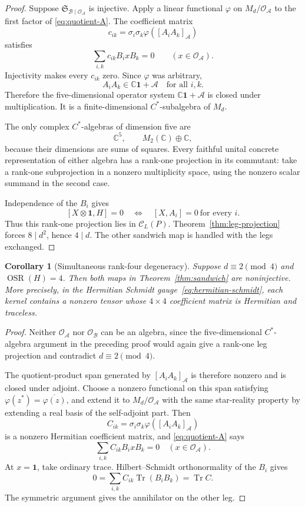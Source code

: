 \documentclass[11pt]{article}
\newtheorem{corollary}[theorem]{Corollary}
\theoremstyle{definition}
\theoremstyle{remark}
\newcommand{\Id}{\mathbf 1}
\newcommand{\Tr}{\operatorname{Tr}}
\newcommand{\OSR}{\operatorname{OSR}}
\newcommand{\bbC}{\mathbb C}
\newcommand{\cA}{\mathcal A}
\newcommand{\cB}{\mathcal B}
\newcommand{\cC}{\mathcal C}
\newcommand{\cO}{\mathcal O}
\newcommand{\cS}{\mathfrak S}
\begin{document}
\begin{proof}
Suppose \(\cS_{\cB\mid\cO_{\cA}}\) is injective. Apply a linear
functional \(\varphi\) on \(M_d/\cO_{\cA}\) to the first factor of
\eqref{eq:quotient-A}. The coefficient matrix
\[
  c_{ik}=\sigma_i\sigma_k
  \varphi([A_iA_k]_{\cA})
\]
satisfies
\[
  \sum_{i,k}c_{ik}B_i xB_k=0
  \qquad(x\in\cO_{\cA}).
\]
Injectivity makes every \(c_{ik}\) zero. Since \(\varphi\) was arbitrary,
\[
  A_iA_k\in\bbC\Id+\cA
  \quad\text{for all }i,k.
\]
Therefore the five-dimensional operator system
\(\bbC\Id+\cA\) is closed under multiplication. It is a finite-dimensional
\(C^*\)-subalgebra of \(M_d\).

The only complex \(C^*\)-algebras of dimension five are
\[
  \bbC^5,\qquad M_2(\bbC)\oplus\bbC,
\]
because their dimensions are sums of squares. Every faithful unital
concrete representation of either algebra has a rank-one projection in
its commutant: take a rank-one subprojection in a nonzero multiplicity
space, using the nonzero scalar summand in the second case.

Independence of the \(B_i\) gives
\[
 [X\otimes\Id,H]=0
 \quad\Longleftrightarrow\quad
 [X,A_i]=0\ \text{for every }i.
\]
Thus this rank-one projection lies in \(\cC_L(P)\).
Theorem~\ref{thm:leg-projection} forces \(8\mid d^2\), hence \(4\mid d\).
The other sandwich map is handled with the legs exchanged.
\end{proof}

\begin{corollary}[Simultaneous rank-four degeneracy]
\label{cor:sandwich-degeneracy}
Suppose \(d\equiv2\pmod4\) and \(\OSR(H)=4\). Then both maps in
Theorem~\ref{thm:sandwich} are noninjective. More precisely, in the
Hermitian Schmidt gauge~\eqref{eq:hermitian-schmidt}, each kernel contains
a nonzero tensor whose \(4\times4\) coefficient matrix is Hermitian and
traceless.
\end{corollary}

\begin{proof}
Neither \(\cO_{\cA}\) nor \(\cO_{\cB}\) can be an algebra, since the
five-dimensional \(C^*\)-algebra argument in the preceding proof would
again give a rank-one leg projection and contradict
\(d\equiv2\pmod4\).

The quotient-product span generated by
\([A_iA_k]_{\cA}\) is therefore nonzero and is closed under adjoint.
Choose a nonzero functional on this span satisfying
\(\varphi(z^*)=\overline{\varphi(z)}\), and extend it to
\(M_d/\cO_{\cA}\) with the same star-reality property by extending a
real basis of the self-adjoint part. Then
\[
  C_{ik}
  =\sigma_i\sigma_k\varphi([A_iA_k]_{\cA})
\]
is a nonzero Hermitian coefficient matrix, and
\eqref{eq:quotient-A} says
\[
  \sum_{i,k}C_{ik}B_i xB_k=0
  \quad(x\in\cO_{\cA}).
\]
At \(x=\Id\), take ordinary trace. Hilbert--Schmidt orthonormality of the
\(B_i\) gives
\[
  0=\sum_{i,k}C_{ik}\Tr(B_iB_k)=\Tr C.
\]
The symmetric argument gives the annihilator on the other leg.
\end{proof}
\end{document}
